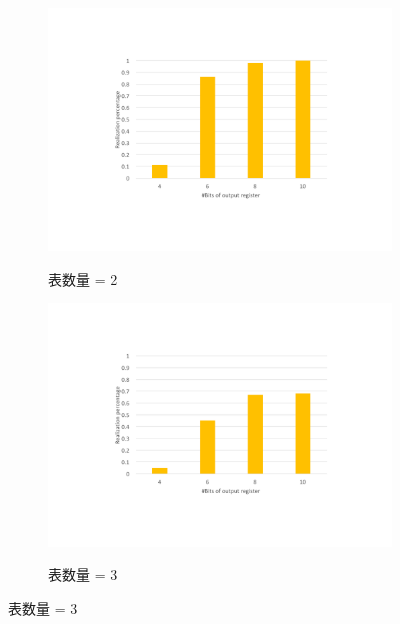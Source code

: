 \begin{figure}  %
  \centering

  \begin{subfigure}[b]{0.4\textwidth}
      \includegraphics[width=\textwidth]{figures/figure-eval-rp-2.pdf}
      \label{cap:fig:eval-rp:a}
      \caption{表数量 = 2}
  \end{subfigure}

  \hspace{1in}

  \begin{subfigure}[b]{0.4\textwidth}
      \includegraphics[width=\textwidth]{figures/figure-eval-rp-3.pdf}
      \label{cap:fig:eval-rp:b}
      \caption{表数量 = 3}
  \end{subfigure}


\end{figure}
